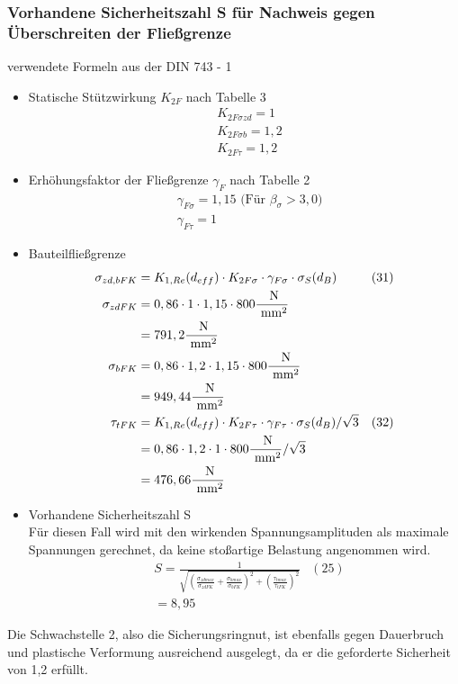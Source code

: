 \subsubsection{Vorhandene Sicherheitszahl S für Nachweis gegen Überschreiten der Fließgrenze}
verwendete Formeln aus der DIN 743 - 1
\begin{itemize}
\item Statische Stützwirkung $K_{2F}$ nach Tabelle 3
	\begin{align*}
	&K_{2F \sigma zd} = 1 \\
	&K_{2F \sigma b} = 1,2 \\
	&K_{2F \tau} = 1,2 
	\end{align*}
\item Erhöhungsfaktor der Fließgrenze $\gamma_{F}$ nach Tabelle 2
	\begin{align*}
	&\gamma_{F\sigma} = 1,15 \text{ (Für } \beta_{\sigma} > 3,0 \text{)} \\
	&\gamma_{F\tau} = 1 
	\end{align*}
\item Bauteilfließgrenze
	\begin{align*}
	\sigma_{zd,bFK} &= K_{1,Re} (d_{eff}) \cdot K_{2F \sigma} \cdot \gamma_{F\sigma} \cdot \sigma_S (d_B) & (31) \\
	\sigma_{zdFK}&= 0,86 \cdot 1 \cdot 1,15 \cdot 800 \frac{\text{ N}}{\text{ mm}^2} \\
	&= 791,2 \frac{\text{ N}}{\text{ mm}^2}\\
	\sigma_{bFK}&= 0,86 \cdot 1,2 \cdot 1,15 \cdot 800 \frac{\text{ N}}{\text{ mm}^2} \\
	&= 949,44\frac{\text{ N}}{\text{ mm}^2}\\
	\tau_{tFK} &= K_{1,Re} (d_{eff}) \cdot K_{2F \tau} \cdot \gamma_{F\tau} \cdot \sigma_S (d_B) / \sqrt{3} &(32) \\
	&= 0,86 \cdot 1,2 \cdot 1 \cdot 800 \frac{\text{ N}}{\text{ mm}^2} / \sqrt{3}\\
	&= 476,66 \frac{\text{ N}}{\text{ mm}^2}
	\end{align*}
	\newpage
\item Vorhandene Sicherheitszahl S \\
	Für diesen Fall wird mit den wirkenden Spannungsamplituden als maximale Spannungen gerechnet, da keine stoßartige Belastung angenommen wird. 
	\begin{align*}
	&S = \frac{1}{\sqrt{\left( \frac{\sigma_{zdmax}}{\sigma_{zdFK}}+\frac{\sigma_{bmax}}{\sigma_{bFK}} \right)^2 +\left( \frac{\tau_{tmax}}{\tau_{tFK}} \right)^2 }} & (25)\\
	&= 8,95 
	\end{align*}
\end{itemize}
Die Schwachstelle 2, also die Sicherungsringnut, ist ebenfalls gegen Dauerbruch und plastische Verformung ausreichend ausgelegt, da er die geforderte Sicherheit von 1,2 erfüllt.